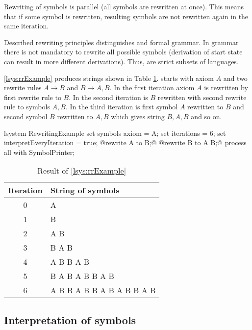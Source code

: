Rewriting of symbols is parallel (all symbols are rewritten at once).
This means that if some symbol is rewritten, resulting symbols are not rewritten again in the same iteration.

Described rewriting principles distinguishes \lsystem and formal grammar.
In grammar there is not mandatory to rewrite all possible symbols (derivation of start state can result in more different derivations).
Thus, \lsystems are strict subsets of languages.

\lsystem \ref{lsys:rrExample} produces strings shown in Table \ref{fig:rrExampleResult}.
\lsystem starts with axiom $A$ and two rewrite rules $A \rightarrow B$ and $B \rightarrow A, B$.
In the first iteration axiom $A$ is rewritten by first rewrite rule to $B$.
In the second iteration is $B$ rewritten with second rewrite rule to symbols $A, B$.
In the third iteration is first symbol $A$ rewritten to $B$ and second symbol $B$ rewritten to $A, B$ which gives string $B, A, B$ and so on.

\begin{Lsystem}[label=lsys:rrExample,caption={Simple \lsystem as example of rewriting principles}]
lsystem RewritingExample {
	set symbols axiom = A;
	set iterations = 6;
	set interpretEveryIteration = true;
	@rewrite A to B;@
	@rewrite B to A B;@
}
process all with SymbolPrinter;
\end{Lsystem}

\begin{table}[h]
	\centering
	\begin{tabular}{c l}
   		\toprule
   		Iteration & String of symbols \\
   		\midrule
		0 & A \\
		1 & B \\
		2 & A B \\
		3 & B A B \\
		4 & A B B A B \\
		5 & B A B A B B A B \\
		6 & A B B A B B A B A B B A B \\
		\bottomrule
	\end{tabular}
	\caption{Result of \lsystem \ref{lsys:rrExample}}
	\label{fig:rrExampleResult}
\end{table}


\subsection{Interpretation of \lsystem symbols}

